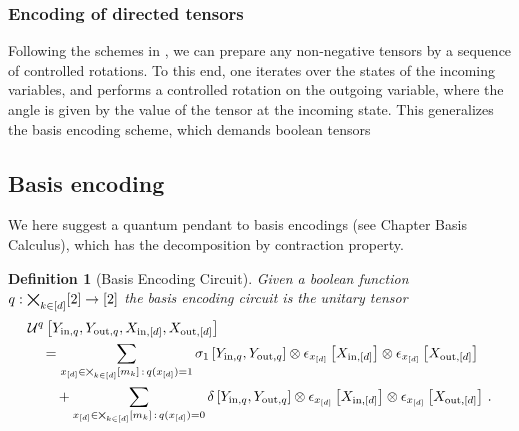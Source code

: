 \documentclass[aps,onecolumn,nofootinbib,pra]{article}
\newtheorem{definition}{Definition}
\begin{document}
    \subsubsection{Encoding of directed tensors}

    Following the schemes in \cite{low_quantum_2014}, we can prepare any non-negative tensors by a sequence of controlled rotations.
    To this end, one iterates over the states of the incoming variables, and performs a controlled rotation on the outgoing variable, where the angle is given by the value of the tensor at the incoming state.
    This generalizes the basis encoding scheme, which demands boolean tensors




    \subsection{Basis encoding}

    We here suggest a quantum pendant to basis encodings (see Chapter Basis Calculus), which has the decomposition by contraction property.

    \begin{definition}[Basis Encoding Circuit]
        Given a boolean function $q:\bigtimes_{k\in[d]}[2]\rightarrow[2]$ the basis encoding circuit is the unitary tensor
        \begin{align*}
            &\mathcal{U}^{q}\left[Y_{\mathrm{in},q},Y_{\mathrm{out},q},X_{\mathrm{in},[d]},X_{\mathrm{out},[d]}\right] \\
            &\quad=
            \sum_{x_{[d]}\in\bigtimes_{k\in[d]}[m_{k}]\,:\,q(x_{[d]})=1}
            \sigma_1\left[Y_{\mathrm{in},q},Y_{\mathrm{out},q}\right] \otimes
            \epsilon_{x_{[d]}}\left[X_{\mathrm{in},[d]}\right] \otimes \epsilon_{x_{[d]}}\left[X_{\mathrm{out},[d]}\right] \\
            & \quad \quad +
            \sum_{x_{[d]}\in\bigtimes_{k\in[d]}[m_{k}]\,:\,q(x_{[d]})=0}
            \delta\left[Y_{\mathrm{in},q},Y_{\mathrm{out},q}\right] \otimes
            \epsilon_{x_{[d]}}\left[X_{\mathrm{in},[d]}\right] \otimes \epsilon_{x_{[d]}}\left[X_{\mathrm{out},[d]}\right] \, .
        \end{align*}
    \end{definition}
\end{document}
